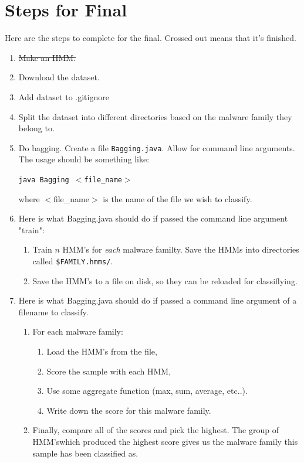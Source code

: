 \documentclass[12pt]{article}
\begin{document}
\section{Steps for Final}
Here are the steps to complete for the final. Crossed out means that it's finished.
\begin{enumerate}
  \item \st{Make an HMM.}
  \item Download the dataset.
  \item Add dataset to .gitignore
  \item Split the dataset into different directories based on the malware family they belong to.
  \item Do bagging. Create a file \texttt{Bagging.java}. Allow for command line arguments. The usage should be something like: 
        
    \texttt{java Bagging $<$file\_name$>$}

    where $<$file\_name$>$ is the name of the file we wish to classify.

  \item Here is what Bagging.java should do if passed the command line argument "train":
    \begin{enumerate}
      \item Train $n$ HMM's for \textit{each} malware familty. Save the HMMs into directories called \texttt{\$FAMILY.hmms/}.
      \item Save the HMM's to a file on disk, so they can be reloaded for classiflying.
    \end{enumerate}

  \item Here is what Bagging.java should do if passed a command line argument of a filename to classify.
    \begin{enumerate}
      \item For each malware family:
        \begin{enumerate}
      \item Load the HMM's from the file,
      \item Score the sample with each HMM,
      \item Use some aggregate function (max, sum, average, etc..).
      \item Write down the score for this malware family.
        \end{enumerate}
      \item Finally, compare all of the scores and pick the highest. The group of HMM'swhich produced the highest score gives us the malware family this sample has been classified as.
    \end{enumerate}
\end{enumerate}
\end{document}
